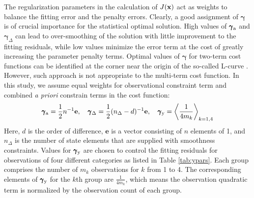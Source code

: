 The regularization parameters in the calculation of $J(\mathbf{x})$ act as weights
to balance the fitting error and the penalty errors. Clearly, a good
assignment of $\pmb{\gamma}$ is of crucial importance for the 
statistical optimal solution. High values of $\pmb{\gamma}_\text{a}$ and
$\pmb{\gamma}_\Delta$ can lead to over-smoothing of the
solution with little improvement to the fitting residuals, while low
values minimize the error term at the cost of greatly increasing the
parameter penalty terms. Optimal values of $\pmb{\gamma}$ for two-term 
cost functions can be identified at the corner near the origin of the 
so-called L-curve \citep{Hansen98}. However, such approach is not 
appropriate to the multi-term cost function. In this study, we assume 
equal weights for observational constraint term and combined 
\textit{a priori} constrain terms in the cost function:
\begin{equation}
\pmb{\gamma}_\text{a}=\frac{1}{2}n^{-1}\mathbf{e}, \quad 
\pmb{\gamma}_\Delta=\frac{1}{2}(n_\Delta-d)^{-1}\mathbf{e}, \quad
\pmb{\gamma}_\text{y}=\left<\frac{1}{4m_k}\right>_{k=1,4}
\end{equation}
Here, $d$ is the order of difference, $\mathbf{e}$ is a vector consisting 
of $n$ elements of 1, and $n_\Delta$ is the number of state elements that 
are supplied with smoothness constraints. Values for $\pmb{\gamma}_\text{y}$ 
are chosen to control the fitting residuals for observations of four 
different categories as listed in Table \ref{tab:ypars}. Each group 
comprises the number of $m_k$ observations for $k$ from 1 to 4. 
The corresponding elements of $\pmb{\gamma}_\text{y}$ for the $k$th group
are $\frac{1}{4m_k}$, which means the observation quadratic term is 
normalized by the observation count of each group.

